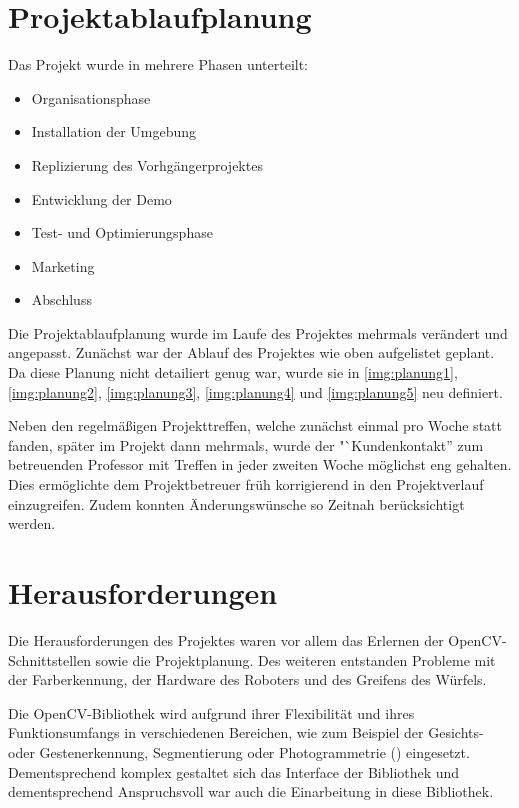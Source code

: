     \section{Projektablaufplanung}

        Das Projekt wurde in mehrere Phasen unterteilt:

        \begin{itemize}
            \item Organisationsphase
            \item Installation der Umgebung
            \item Replizierung des Vorhgängerprojektes
            \item Entwicklung der Demo
            \item Test- und Optimierungsphase
            \item Marketing
            \item Abschluss
        \end{itemize}

        Die Projektablaufplanung wurde im Laufe des Projektes mehrmals verändert
        und angepasst.
        Zunächst war der Ablauf des Projektes wie oben aufgelistet geplant.
        Da diese Planung nicht detailiert genug war, wurde sie in
        \autoref{img:planung1},
        \autoref{img:planung2},
        \autoref{img:planung3},
        \autoref{img:planung4} und
        \autoref{img:planung5}
        neu definiert.

        Neben den regelmäßigen Projekttreffen, welche zunächst einmal pro Woche
        statt fanden, später im Projekt dann mehrmals, wurde der
        "`Kundenkontakt'' zum betreuenden Professor mit Treffen in jeder zweiten
        Woche möglichst eng gehalten.
        Dies ermöglichte dem Projektbetreuer früh korrigierend in den
        Projektverlauf einzugreifen.
        Zudem konnten Änderungswünsche so Zeitnah berücksichtigt werden.

    \section{Herausforderungen}

        Die Herausforderungen des Projektes waren vor allem das Erlernen der
        OpenCV-Schnittstellen sowie die Projektplanung.
        Des weiteren entstanden Probleme mit der Farberkennung, der Hardware des
        Roboters und des Greifens des Würfels.

        Die OpenCV-Bibliothek wird aufgrund ihrer Flexibilität und ihres
        Funktionsumfangs in verschiedenen Bereichen, wie zum Beispiel der
        Gesichts- oder Gestenerkennung, Segmentierung oder Photogrammetrie
        (\cite{wiki:opencv}) eingesetzt.
        Dementsprechend komplex gestaltet sich das Interface der Bibliothek und
        dementsprechend Anspruchsvoll war auch die Einarbeitung in diese
        Bibliothek.

